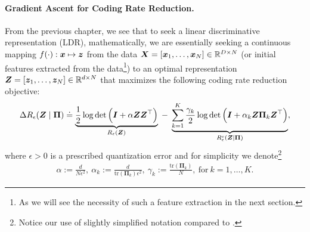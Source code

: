 \documentclass[\toplevelprefix/book-main.tex]{subfiles}
\begin{document}
\paragraph{Gradient Ascent for Coding Rate Reduction.} From the previous chapter, we see that to seek a linear discriminative representation (LDR), mathematically, we are essentially seeking a continuous mapping $f(\cdot): \bm{x} \mapsto \bm{z}$ from the data $\bm{X} = [\bm{x}_1, \ldots, \bm{x}_N] \in \mathbb{R}^{D \times N}$ (or initial features extracted from the data\footnote{As we will see the necessity of such a feature extraction in the next section.}) to an optimal representation $\bm{Z} = [\bm{z}_1, \ldots, \bm{z}_N] \in \mathbb{R}^{d \times N}$ that maximizes the following coding rate reduction objective:
\begin{equation}\label{eq:mcr-formulation}
\begin{split}
\Delta R_{\epsilon}(\bm{Z} \mid \bm{\Pi}) \doteq \underbrace{\frac{1}{2}\log\det \Big(\bm{I} + {\alpha} \bm{Z} \bm{Z}^{\top} \Big)}_{R_{\epsilon}(\bm{Z})} \;-\; \underbrace{\sum_{k=1}^{K}\frac{\gamma_{k}}{2} \log\det\Big(\bm{I} + {\alpha_{k}} \bm{Z} \bm{\Pi}_{k} \bm{Z}^{\top} \Big)}_{R_{\epsilon}^c(\bm{Z} \mid \bm \Pi)},
\end{split}
\end{equation}
where $\epsilon > 0$ is a prescribed quantization error and for simplicity we denote\footnote{Notice our use of slightly simplified notation compared to .}
\begin{align*}
    \alpha := \frac{d}{N\epsilon^2},\ \alpha_{k} := \frac{d}{\mathrm{tr}(\bm{\Pi}_{k})\epsilon^2},\ \gamma_{k} := \frac{\mathrm{tr}(\bm{\Pi}_{k})}{N},\ \text{for}\ k = 1,\ldots, K.
\end{align*}
\end{document}
